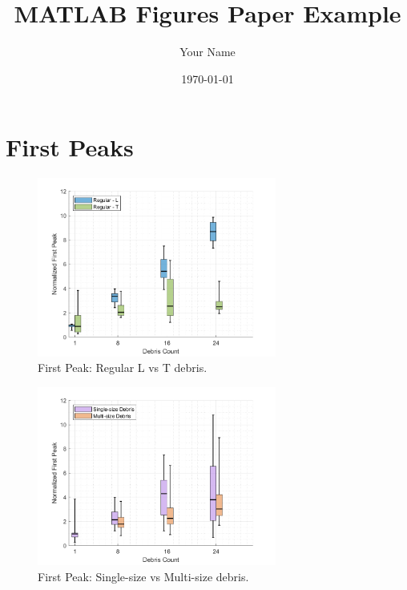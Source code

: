 \documentclass[12pt,a4paper]{article}
\title{MATLAB Figures Paper Example}
\author{Your Name}
\date{\today}
\begin{document}
\maketitle

\section{First Peaks}

\begin{figure}[h!]
    \centering
    \includegraphics[width=0.7\textwidth]{figures/FirstPeak_Regular_L_vs_T.png}
    \caption{First Peak: Regular L vs T debris.}
    \label{fig:FirstPeak_Regular_L_vs_T}
\end{figure}

\begin{figure}[h!]
    \centering
    \includegraphics[width=0.7\textwidth]{figures/FirstPeak_Single_vs_Multi.png}
    \caption{First Peak: Single-size vs Multi-size debris.}
    \label{fig:FirstPeak_Single_vs_Multi}
\end{figure}
\end{document}
